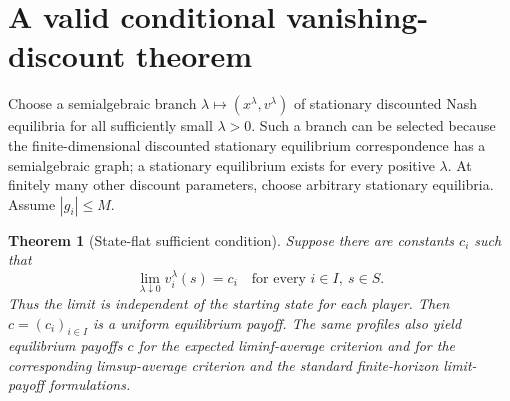 \documentclass[11pt,a4paper]{article}
\numberwithin{equation}{section}
\newtheorem{theorem}{Theorem}[section]
\theoremstyle{definition}
\theoremstyle{remark}
\begin{document}
\section{A valid conditional vanishing-discount theorem}
\label{sec:flat}
Choose a semialgebraic branch $\lambda\mapsto(x^\lambda,v^\lambda)$ of
stationary discounted Nash equilibria for all sufficiently small $\lambda>0$.
Such a branch can be selected because the finite-dimensional discounted
stationary equilibrium correspondence has a semialgebraic graph; a stationary
equilibrium exists for every positive $\lambda$. At finitely many other
discount parameters, choose arbitrary stationary equilibria.
Assume $|g_i|\le M$.

\begin{theorem}[State-flat sufficient condition]\label{thm:flat}
Suppose there are constants $c_i$ such that
\begin{equation}\label{eq:flat}
 \lim_{\lambda\downarrow0}v_i^\lambda(s)=c_i
 \quad\text{for every }i\in I,\ s\in S.
\end{equation}
Thus the limit is independent of the starting state for each player.
Then $c=(c_i)_{i\in I}$ is a uniform equilibrium payoff. The same profiles
also yield equilibrium payoffs $c$ for the expected liminf-average criterion
and for the corresponding limsup-average criterion and the standard
finite-horizon limit-payoff formulations.
\end{theorem}
\end{document}
